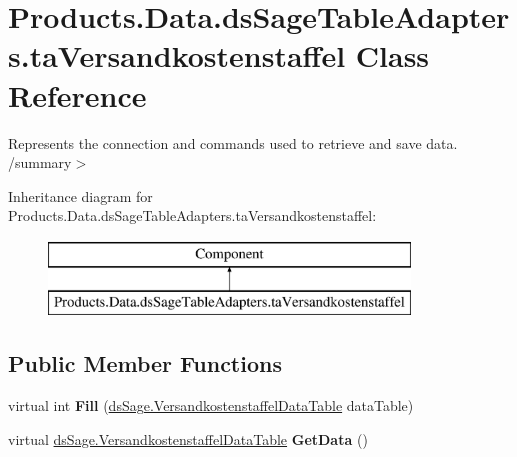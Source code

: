 \hypertarget{class_products_1_1_data_1_1ds_sage_table_adapters_1_1ta_versandkostenstaffel}{}\section{Products.\+Data.\+ds\+Sage\+Table\+Adapters.\+ta\+Versandkostenstaffel Class Reference}
\label{class_products_1_1_data_1_1ds_sage_table_adapters_1_1ta_versandkostenstaffel}


Represents the connection and commands used to retrieve and save data. /summary$>$  


Inheritance diagram for Products.\+Data.\+ds\+Sage\+Table\+Adapters.\+ta\+Versandkostenstaffel\+:\begin{figure}[H]
\begin{center}
\leavevmode
\includegraphics[height=2.000000cm]{class_products_1_1_data_1_1ds_sage_table_adapters_1_1ta_versandkostenstaffel}
\end{center}
\end{figure}
\subsection*{Public Member Functions}
\begin{DoxyCompactItemize}
\item 
virtual int {\bfseries Fill} (\hyperlink{class_products_1_1_data_1_1ds_sage_1_1_versandkostenstaffel_data_table}{ds\+Sage.\+Versandkostenstaffel\+Data\+Table} data\+Table)\hypertarget{class_products_1_1_data_1_1ds_sage_table_adapters_1_1ta_versandkostenstaffel_a940f7b84fb3d4023eb8fcad97a7a8766}{}\label{class_products_1_1_data_1_1ds_sage_table_adapters_1_1ta_versandkostenstaffel_a940f7b84fb3d4023eb8fcad97a7a8766}

\item 
virtual \hyperlink{class_products_1_1_data_1_1ds_sage_1_1_versandkostenstaffel_data_table}{ds\+Sage.\+Versandkostenstaffel\+Data\+Table} {\bfseries Get\+Data} ()\hypertarget{class_products_1_1_data_1_1ds_sage_table_adapters_1_1ta_versandkostenstaffel_a7ea54dea1b9d5be81f8d1607297c4ada}{}\label{class_products_1_1_data_1_1ds_sage_table_adapters_1_1ta_versandkostenstaffel_a7ea54dea1b9d5be81f8d1607297c4ada}

\end{DoxyCompactItemize}
